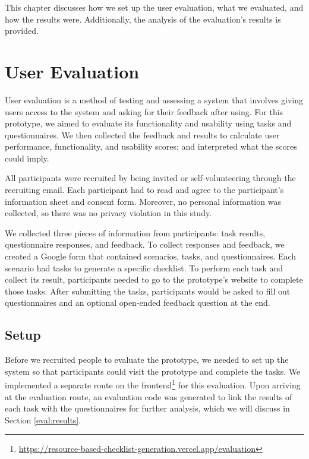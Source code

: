 This chapter discusses how we set up the user evaluation, what we evaluated, and how the results were. Additionally, the analysis of the evaluation's results is provided.


\section{User Evaluation}

User evaluation is a method of testing and assessing a system that involves giving users access to the system and asking for their feedback after using. For this prototype, we aimed to evaluate its functionality and usability using tasks and questionnaires. We then collected the feedback and results to calculate user performance, functionality, and usability scores; and interpreted what the scores could imply. 

All participants were recruited by being invited or self-volunteering through the recruiting email. Each participant had to read and agree to the participant's information sheet and consent form.
Moreover, no personal information was collected, so there was no privacy violation in this study.

We collected three pieces of information from participants: task results, questionnaire responses, and feedback.
To collect responses and feedback, we created a Google form that contained scenarios, tasks, and questionnaires.
Each scenario had tasks to generate a specific checklist. To perform each task and collect its result, participants needed to go to the prototype's website to complete those tasks. After submitting the tasks, participants would be asked to fill out questionnaires and an optional open-ended feedback question at the end.

\subsection{Setup}
Before we recruited people to evaluate the prototype, we needed to set up the system so that participants could visit the prototype and complete the tasks. We implemented a separate route on the frontend\footnote{\href{https://resource-based-checklist-generation.vercel.app/evaluation}{https://resource-based-checklist-generation.vercel.app/evaluation}} for this evaluation.
Upon arriving at the evaluation route, an evaluation code was generated to link the results of each task with the questionnaires for further analysis, which we will discuss in Section \ref{eval:results}.

